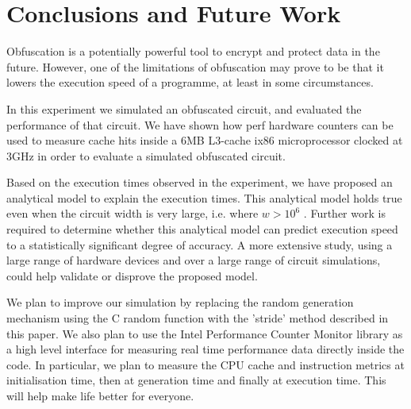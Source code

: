 \section{Conclusions and Future Work}
Obfuscation is a potentially powerful tool to encrypt and protect data in the future. However, one of the limitations of obfuscation may prove to be that it lowers the execution speed of a programme, at least in some circumstances.
\par
In this experiment we simulated an obfuscated circuit, and evaluated the performance of that circuit. We have shown how perf hardware counters can be used to measure cache hits inside a 6MB L3-cache ix86 microprocessor clocked at 3GHz in order to evaluate a simulated obfuscated circuit.
\par
Based on the execution times observed in the experiment, we have proposed an analytical model to explain the execution times. This analytical model holds true even when the circuit width is very large, i.e. where $w > 10^6$ . Further work is required to determine whether this analytical model can predict execution speed to a statistically significant degree of accuracy. A more extensive study, using a large range of hardware devices and over a large range of circuit simulations, could help validate or disprove the proposed model.
\par
We plan to improve our simulation by replacing the random generation mechanism using the C random function with the ’stride’ method described in this paper. We also plan to use the Intel Performance Counter Monitor library as a high level interface for measuring real time performance data directly inside the code. In particular, we plan to measure the CPU cache and instruction metrics at initialisation time, then at generation time and finally at execution time. This will help make life better for everyone.